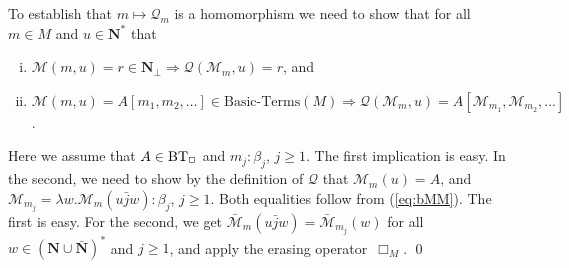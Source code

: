 \documentclass[fleqn]{LMCS}
\theoremstyle{plain}\newtheorem{satz}[thm]{Satz}
\theoremstyle{plain}\newtheorem{hyp}[thm]{Hypothesis}
\theoremstyle{plain}\newtheorem{hyps}[thm]{Hypotheses}
\theoremstyle{definition}\newtheorem{note}[thm]{Note}
\newcommand{\Arrr}{\Longrightarrow}
\newcommand{\NN}{\mathbf{N}}
\newcommand{\bNN}{\bar{\NN}}
\newcommand{\bMM}{\bar{\MM}}
\newcommand{\Undef}{{\perp}}
\newcommand{\MM}{{\mathcal M}}
\newcommand{\bj}{\bar{j}}
\newcommand{\QQ}{{\mathcal Q}}
\newcommand{\?}{\mbox{?}}
\begin{document}
To establish that $m\mapsto\QQ_m$ is a homomorphism we need to show that 
for all $m\in M$ and $u\in \NN^*$ that 
\begin{enumerate}[(i)]
\item $\MM(m,u)=r\in\NN_\Undef\Arrr\QQ(\MM_m,u)=r$, and
\item $\MM(m,u)=A[m_1,m_2,\ldots]\in\textrm{Basic-Terms}(M)\Arrr
                 \QQ(\MM_m,u)=A[\MM_{m_1},\MM_{m_2},\ldots]$. 
\end{enumerate}
Here we assume that $A\in\mbox{BT}_\Box$ and $m_j:\beta_j$, $j\ge1$. 
The first implication is easy. 
In the second, we need to show by the definition of $\QQ$ that 
$\MM_m(u)=A$, and $\MM_{m_j}=\lambda w.\MM_m(u\bj w):\beta_j$, 
$j\ge1$. Both equalities follow from (\ref{eq:bMM}). The first is easy. For the second, 
we get $\bMM_m(u\bj w)=\bMM_{m_j}(w)$ 
for all $w\in(\NN\cup\bNN)^*$ and $j\ge1$, 
and apply the erasing operator~$\Box_M$. \qed
\end{document}
